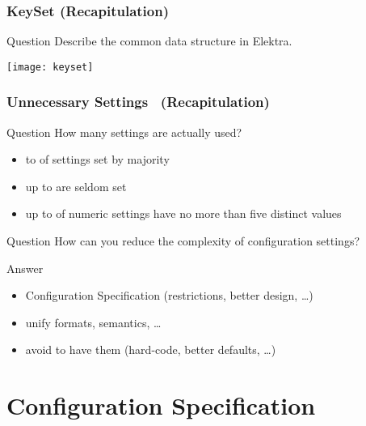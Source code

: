 \begin{frame}
	\frametitle{KeySet (Recapitulation)}

	\begin{alertblock}{Question}
	Describe the common data structure in Elektra.
	\end{alertblock}

	\vspace{1cm}
	\pause

	\texttt{[image: keyset]}
\end{frame}

\begin{frame}
	\frametitle{Unnecessary Settings~\cite{xu2015hey} (Recapitulation)}

	\begin{alertblock}{Question}
	How many settings are actually used?
	\end{alertblock}

	\pause

	\begin{itemize}
	\item {} to  of settings set by majority
	\item up to  are seldom set
	\item up to  of numeric settings have no more than five distinct values
	\end{itemize}
\end{frame}

\begin{frame}
	\begin{alertblock}{Question}
	How can you reduce the complexity of configuration settings?
	\end{alertblock}

	\pause
	\begin{exampleblock}{Answer}
	\begin{itemize}
	\item Configuration Specification (restrictions, better design, \dots)
	\item unify formats, semantics, \dots
	\item avoid to have them (hard-code, better defaults, \dots)
	\end{itemize}
	\end{exampleblock}
\end{frame}




\section{Configuration Specification}

